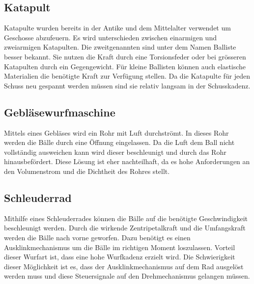 \subsection{Katapult}
Katapulte wurden bereits in der Antike und dem Mittelalter verwendet um Geschosse abzufeuern. Es wird unterschieden zwischen einarmigen und zweiarmigen Katapulten. Die zweitgenannten sind unter dem Namen Balliste besser bekannt. Sie nutzen die Kraft durch eine Torsionsfeder oder bei grösseren Katapulten durch ein Gegengewicht. Für kleine Ballisten können auch elastische Materialien die benötigte Kraft zur Verfügung stellen. Da die Katapulte für jeden Schuss neu gespannt werden müssen sind sie relativ langsam in der Schusskadenz. 

\subsection{Gebläsewurfmaschine}
Mittels eines Gebläses wird ein Rohr mit Luft durchströmt. In dieses Rohr werden die Bälle durch eine Öffnung eingelassen. Da die Luft dem Ball nicht vollständig ausweichen kann wird dieser beschleunigt und durch das Rohr hinausbefördert. Diese Lösung ist eher nachteilhaft, da es hohe Anforderungen an den Volumenstrom und die Dichtheit des Rohres stellt.

\subsection{Schleuderrad}
Mithilfe eines Schleuderrades können die Bälle auf die benötigte Geschwindigkeit beschleunigt werden. Durch die wirkende Zentripetalkraft und die Umfangskraft werden die Bälle nach vorne geworfen. Dazu benötigt es einen Ausklinkmechanismus um die Bälle im richtigen Moment loszulassen. Vorteil dieser Wurfart ist, dass eine hohe Wurfkadenz erzielt wird. Die Schwierigkeit dieser Möglichkeit ist es, dass der Ausklinkmechanismus auf dem Rad ausgelöst werden muss und diese Steuersignale auf den Drehmechanismus gelangen müssen.
